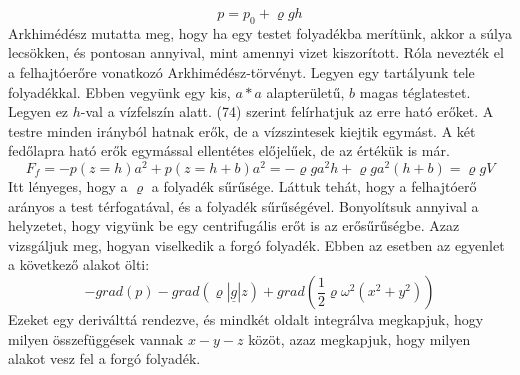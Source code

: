 \documentclass[a4paper,12pt]{article}
\begin{document}
\begin{equation}
p=p_0+\varrho g h
\end{equation}
Arkhimédész mutatta meg, hogy ha egy testet folyadékba merítünk, akkor a súlya lecsökken, és pontosan annyival, mint amennyi vizet kiszorított. Róla nevezték el a felhajtóerőre vonatkozó Arkhimédész-törvényt. Legyen egy tartályunk tele folyadékkal. Ebben vegyünk egy kis, $a*a$ alapterületű, $b$ magas téglatestet. Legyen ez $h$-val a vízfelszín alatt. (74) szerint felírhatjuk az erre ható erőket. A testre minden irányból hatnak erők, de a vízszintesek kiejtik egymást. A két fedőlapra ható erők egymással ellentétes előjelűek, de az értékük is már.
\begin{equation}
F_f=-p(z=h)a^2+p(z=h+b)a^2=-\varrho ga^2h+\varrho ga^2(h+b)=\varrho gV
\end{equation}
Itt lényeges, hogy a $\varrho$ a folyadék sűrűsége. Láttuk tehát, hogy a felhajtóerő arányos a test térfogatával, és a folyadék sűrűségével.
Bonyolítsuk annyival a helyzetet, hogy vigyünk be egy centrifugális erőt is az erősűrűségbe. Azaz vizsgáljuk meg, hogyan viselkedik a forgó folyadék. Ebben az esetben az egyenlet a következő alakot ölti:
\begin{equation}
-grad(p)-grad(\varrho|\underline{g}|z)+grad(\frac{1}{2}\varrho\omega^2(x^2+y^2))
\end{equation}
Ezeket egy deriválttá rendezve, és mindkét oldalt integrálva megkapjuk, hogy milyen összefüggések vannak $x-y-z$ közöt, azaz megkapjuk, hogy milyen alakot vesz fel a forgó folyadék.
\end{document}
